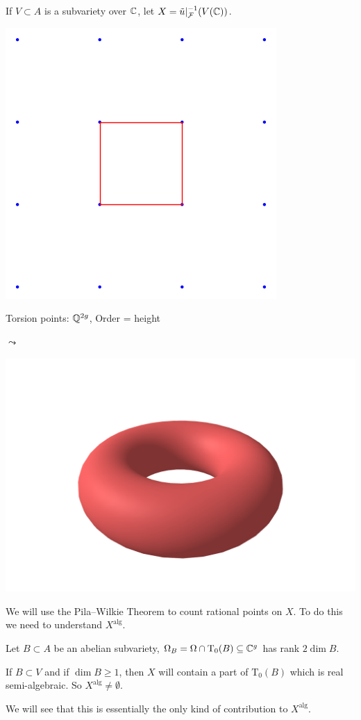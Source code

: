 \documentclass{beamer}
\begin{document}
\begin{frame}
  If $V\subset A$ is a subvariety over ${\mathbb{C}}$, let $X =
  \tilde u|_{{\mathcal F}}^{-1}(V({\mathbb{C}}))$.

    \begin{center}
    \begin{minipage}{0.45\linewidth}
      \begin{center}
        \includegraphics[width=.35\textwidth]{fundamentaldomainav2.png}
        
        Torsion points: ${\mathbb{Q}}^{2g}$, Order = height
      \end{center}    
    \end{minipage}$\leadsto$    \begin{minipage}{0.35\linewidth}
      \begin{center}
        \includegraphics[width=\textwidth]{torus.png}
      \end{center}
    \end{minipage}
  \end{center}

  We will use the Pila--Wilkie Theorem to count rational points on
  $X$.
  To do this we need to understand $X^{\mathrm{alg}}$.
  
  \begin{example}
    Let $B\subset A$ be an abelian subvariety, $\Omega_B = \Omega \cap
    \mathrm{T}_0(B) \subseteq{\mathbb{C}}^g$ has rank $2\dim B$.

    If $B\subset V$ and if $\dim B\ge 1$, then $X$ will contain
    a part of $\mathrm{T}_0(B)$ which is real semi-algebraic. So
    $X^{\mathrm{alg}}\not=\emptyset$.

    We will see that this is essentially the \alert{only} kind of
    contribution to $X^{\mathrm{alg}}$.
  \end{example}
\end{frame}
\end{document}
